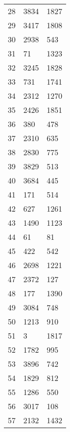 \begin{longtable}[c]{ p{} p{} p{} }
	28          & 3834          & 1827         \\
	29          & 3417          & 1808         \\
	30          & 2938          & 543          \\
	31          & 71            & 1323         \\
	32          & 3245          & 1828         \\
	33          & 731           & 1741         \\
	34          & 2312          & 1270         \\
	35          & 2426          & 1851         \\
	36          & 380           & 478          \\
	37          & 2310          & 635          \\
	38          & 2830          & 775          \\
	39          & 3829          & 513          \\
	40          & 3684          & 445          \\
	41          & 171           & 514          \\
	42          & 627           & 1261         \\
	43          & 1490          & 1123         \\
	44          & 61            & 81           \\
	45          & 422           & 542          \\
	46          & 2698          & 1221         \\
	47          & 2372          & 127          \\
	48          & 177           & 1390         \\
	49          & 3084          & 748          \\
	50          & 1213          & 910          \\
	51          & 3             & 1817         \\
	52          & 1782          & 995          \\
	53          & 3896          & 742          \\
	54          & 1829          & 812          \\
	55          & 1286          & 550          \\
	56          & 3017          & 108          \\
	57          & 2132          & 1432         \\

\end{longtable}
